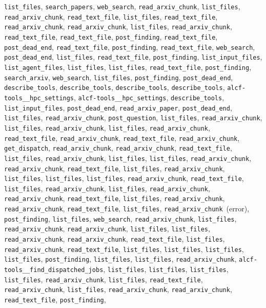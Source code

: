 \documentclass[11pt,a4paper]{article}
\begin{document}
\texttt{list\_files}, \texttt{search\_papers}, \texttt{web\_search}, \texttt{read\_arxiv\_chunk}, \texttt{list\_files}, \texttt{read\_arxiv\_chunk}, \texttt{read\_text\_file}, \texttt{list\_files}, \texttt{read\_text\_file}, \texttt{read\_arxiv\_chunk}, \texttt{read\_arxiv\_chunk}, \texttt{list\_files}, \texttt{read\_arxiv\_chunk}, \texttt{read\_text\_file}, \texttt{read\_text\_file}, \texttt{post\_finding}, \texttt{read\_text\_file}, \texttt{post\_dead\_end}, \texttt{read\_text\_file}, \texttt{post\_finding}, \texttt{read\_text\_file}, \texttt{web\_search}, \texttt{post\_dead\_end}, \texttt{list\_files}, \texttt{read\_text\_file}, \texttt{post\_finding}, \texttt{list\_input\_files}, \texttt{list\_agent\_files}, \texttt{list\_files}, \texttt{list\_files}, \texttt{read\_text\_file}, \texttt{post\_finding}, \texttt{search\_arxiv}, \texttt{web\_search}, \texttt{list\_files}, \texttt{post\_finding}, \texttt{post\_dead\_end}, \texttt{describe\_tools}, \texttt{describe\_tools}, \texttt{describe\_tools}, \texttt{describe\_tools}, \texttt{alcf-tools\_\_hpc\_settings}, \texttt{alcf-tools\_\_hpc\_settings}, \texttt{describe\_tools}, \texttt{list\_input\_files}, \texttt{post\_dead\_end}, \texttt{read\_arxiv\_paper}, \texttt{post\_dead\_end}, \texttt{list\_files}, \texttt{read\_arxiv\_chunk}, \texttt{post\_question}, \texttt{list\_files}, \texttt{read\_arxiv\_chunk}, \texttt{list\_files}, \texttt{read\_arxiv\_chunk}, \texttt{list\_files}, \texttt{read\_arxiv\_chunk}, \texttt{read\_text\_file}, \texttt{read\_arxiv\_chunk}, \texttt{read\_text\_file}, \texttt{read\_arxiv\_chunk}, \texttt{get\_dispatch}, \texttt{read\_arxiv\_chunk}, \texttt{read\_arxiv\_chunk}, \texttt{read\_text\_file}, \texttt{list\_files}, \texttt{read\_arxiv\_chunk}, \texttt{list\_files}, \texttt{list\_files}, \texttt{read\_arxiv\_chunk}, \texttt{read\_arxiv\_chunk}, \texttt{read\_text\_file}, \texttt{list\_files}, \texttt{read\_arxiv\_chunk}, \texttt{list\_files}, \texttt{list\_files}, \texttt{list\_files}, \texttt{read\_arxiv\_chunk}, \texttt{read\_text\_file}, \texttt{list\_files}, \texttt{read\_arxiv\_chunk}, \texttt{list\_files}, \texttt{read\_arxiv\_chunk}, \texttt{read\_arxiv\_chunk}, \texttt{read\_text\_file}, \texttt{list\_files}, \texttt{read\_arxiv\_chunk}, \texttt{read\_arxiv\_chunk}, \texttt{read\_text\_file}, \texttt{list\_files}, \texttt{read\_arxiv\_chunk}~(error), \texttt{post\_finding}, \texttt{list\_files}, \texttt{web\_search}, \texttt{read\_arxiv\_chunk}, \texttt{list\_files}, \texttt{read\_arxiv\_chunk}, \texttt{read\_arxiv\_chunk}, \texttt{list\_files}, \texttt{list\_files}, \texttt{read\_arxiv\_chunk}, \texttt{read\_arxiv\_chunk}, \texttt{read\_text\_file}, \texttt{list\_files}, \texttt{read\_arxiv\_chunk}, \texttt{read\_text\_file}, \texttt{list\_files}, \texttt{list\_files}, \texttt{list\_files}, \texttt{list\_files}, \texttt{post\_finding}, \texttt{list\_files}, \texttt{list\_files}, \texttt{read\_arxiv\_chunk}, \texttt{alcf-tools\_\_find\_dispatched\_jobs}, \texttt{list\_files}, \texttt{list\_files}, \texttt{list\_files}, \texttt{list\_files}, \texttt{read\_arxiv\_chunk}, \texttt{list\_files}, \texttt{read\_text\_file}, \texttt{read\_arxiv\_chunk}, \texttt{list\_files}, \texttt{read\_arxiv\_chunk}, \texttt{read\_arxiv\_chunk}, \texttt{read\_text\_file}, \texttt{post\_finding}, 
\end{document}
